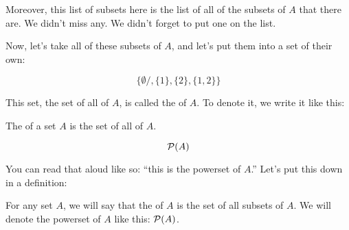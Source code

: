 \documentclass[../../../main.tex]{subfiles}
\begin{document}
Moreover, this list of subsets here is the list of all of the subsets of $A$ that there are. We didn't miss any. We didn't forget to put one on the list.

Now, let's take all of these subsets of $A$, and let's put them into a set of their own:

\begin{equation*}
  \{ \emptyset/, \{ 1 \}, \{ 2 \}, \{ 1, 2 \} \}
\end{equation*}

This set, the set of all  of $A$, is called the  of $A$. To denote it, we write it like this:

\begin{terminology}
  The  of a set $A$ is the set of all  of $A$.
\end{terminology}

\begin{equation*}
  \mathcal{P}(A)
\end{equation*}

You can read that aloud like so: ``this is the powerset of $A$.'' Let's put this down in a definition:

\begin{fdefinition}[Powerset]
  For any set $A$, we will say that the  of $A$ is the set of all subsets of $A$. We will denote the powerset of $A$ like this: $\mathcal{P}(A)$.
\end{fdefinition}
\end{document}
